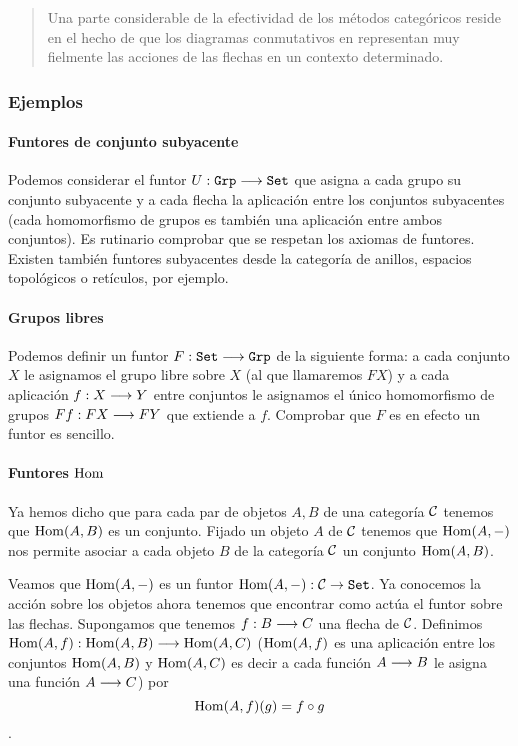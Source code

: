 \begin{quotation}
  Una parte considerable de la efectividad de los métodos
  categóricos reside en el hecho de que los diagramas
  conmutativos en representan muy fielmente las acciones de
  las flechas en un contexto determinado.
\end{quotation}

\subsubsection{Ejemplos}
\paragraph{Funtores de conjunto subyacente}
Podemos considerar el funtor $U : \texttt{Grp}\longrightarrow \texttt{Set}$
que asigna a cada grupo su conjunto subyacente y a cada flecha la
aplicación entre los conjuntos subyacentes (cada homomorfismo de
grupos es también una aplicación entre ambos conjuntos). Es rutinario
comprobar que se respetan los axiomas de funtores. Existen también
funtores subyacentes desde la categoría de anillos, espacios topológicos
o retículos, por ejemplo.

\paragraph{Grupos libres}
Podemos definir un funtor $F : \texttt{Set}\longrightarrow \texttt{Grp}$ de la siguiente
forma: a cada conjunto $X$ le asignamos el grupo libre sobre $X$
(al que llamaremos $F X$) y a
cada aplicación $f : X\longrightarrow Y$ entre conjuntos le asignamos el
único homomorfismo de grupos $F f: F X\longrightarrow F Y$ que extiende a $f$.
Comprobar que
$F$ es en efecto un funtor es sencillo.

\paragraph{Funtores $\operatorname{Hom}$}
Ya hemos dicho que para cada par de objetos $A, B$ de
una categoría $\mathcal{C}$ tenemos que
$\operatorname{Hom}(A, B)$ es un conjunto. Fijado un objeto $A$ de
$\mathcal{C}$ tenemos que $\operatorname{Hom}(A, -)$ nos permite asociar a cada
objeto $B$ de la categoría $\mathcal{C}$ un conjunto $\operatorname{Hom}(A, B)$.

Veamos que $\operatorname{Hom}(A, -)$ es un funtor
$\operatorname{Hom}(A, -) : \mathcal{C} \rightarrow \texttt{Set}$. Ya conocemos la acción
sobre los objetos ahora tenemos que encontrar como actúa
el funtor sobre las flechas. Supongamos que tenemos
$f : B\longrightarrow C$ una flecha de $\mathcal{C}$. Definimos
$\operatorname{Hom}(A, f) : \operatorname{Hom}(A, B)\longrightarrow \operatorname{Hom}(A, C)$
($\operatorname{Hom}(A, f)$ es una aplicación entre los conjuntos
$\operatorname{Hom}(A, B)$ y $\operatorname{Hom}(A, C)$ es decir a cada función $A\longrightarrow B$
le asigna una función $A\longrightarrow C$) por
$$\operatorname{Hom}(A, f)(g) = f \circ g $$.

